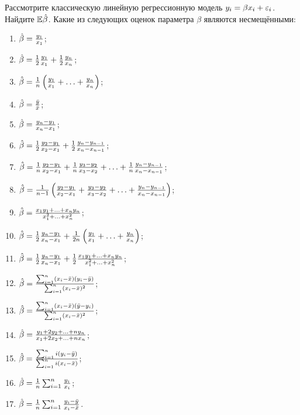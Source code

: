 \begin{problem}
Рассмотрите классическую линейную регрессионную модель $y_i = \beta x_i + \varepsilon_i$. Найдите $\mathbb{E} \hat{\beta}$. Какие из следующих оценок параметра $\beta$ являются несмещёнными:

\begin{enumerate}
\item $\hat{\beta} = \frac{y_1}{x_1}$;
\item $\hat{\beta} = \frac{1}{2} \frac{y_1}{x_1} + \frac{1}{2} \frac{y_n}{x_n}$;
\item $\hat{\beta} = \frac{1}{n} \left(  \frac{y_1}{x_1} + \ldots + \frac{y_n}{x_n} \right) $;
\item $\hat{\beta} = \frac{\bar{y}}{\bar{x}}$;
\item $\hat{\beta} = \frac{y_n - y_1}{x_n - x_1}$;
\item $\hat{\beta} = \frac{1}{2} \frac{y_2 - y_1}{x_2 - x_1} + \frac{1}{2} \frac{y_n - y_{n-1}}{x_n - x_{n-1}}$;
\item $\hat{\beta} = \frac{1}{n} \frac{y_2 - y_1}{x_2 - x_1} + \frac{1}{n} \frac{y_3 - y_2}{x_3 - x_2} + \ldots + \frac{1}{n} \frac{y_n - y_{n-1}}{x_n - x_{n-1}}$;
\item $\hat{\beta} = \frac{1}{n-1} \left( \frac{y_2 - y_1}{x_2 - x_1} + \frac{y_3 - y_2}{x_3 - x_2} + \ldots + \frac{y_n - y_{n-1}}{x_n - x_{n-1}} \right) $;
\item $\hat{\beta} = \frac{x_1 y_1 + \ldots + x_n y_n}{x_1^2 + \ldots + x_n^2}$;
\item $\hat{\beta} = \frac{1}{2} \frac{y_n - y_1}{x_n - x_1} + \frac{1}{2n}  \left( \frac{y_1}{x_1} + \ldots + \frac{y_n}{x_n} \right) $;
\item $\hat{\beta} =  \frac{1}{2} \frac{y_n - y_1}{x_n - x_1} + \frac{1}{2} \frac{x_1 y_1 + \ldots + x_n y_n}{x_1^2 + \ldots + x_n^2}$;
\item $\hat{\beta} = \frac{\sum_{i=1}^n (x_i - \bar{x})(y_i - \bar{y})}{\sum_{i=1}^n (x_i - \bar{x})^2}$;
\item $\hat{\beta} = \frac{\sum_{i=1}^n (x_i - \bar{x})(\bar{y} - y_i)}{\sum_{i=1}^n (x_i - \bar{x})^2}$;
\item $\hat{\beta} = \frac{y_1 + 2 y_2 + \ldots + n y_n}{x_1 + 2 x_2 + \ldots + n x_n}$;
\item $\hat{\beta} = \frac{\sum_{i=1}^n i(y_i - \bar{y})}{\sum_{i=1}^n i(x_i - \bar{x})}$;
\item $\hat{\beta} = \frac{1}{n} \sum_{i=1}^n \frac{y_i}{x_i}$;
\item $\hat{\beta} = \frac{1}{n} \sum_{i=1}^n \frac{y_i - \bar{y}}{x_i - \bar{x}}$.
\end{enumerate}



\end{problem}

